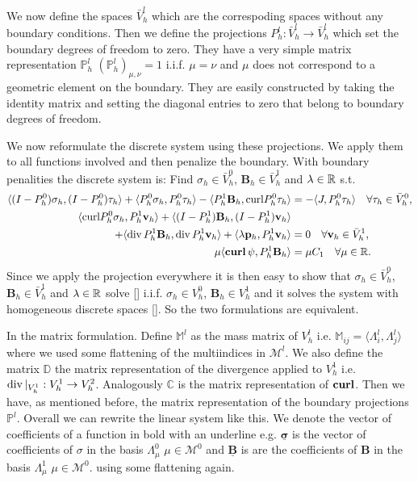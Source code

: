 \documentclass[../master_thesis.tex]{subfiles}
\begin{document}
We now define the spaces $\bar{V}_h^l$ which are the correspoding spaces 
without any boundary conditions. Then we define the 
projections $P_h^l: \bar{V}_h^l \rightarrow \bar{V}_h^l$ which set 
the boundary degrees of freedom to zero. They have a very simple 
matrix representation $\mathbb{P}_h^l$ 
$(\mathbb{P}_h^l)_{\mu, \nu} = 1 $ i.i.f. $\mu = \nu$ and $\mu$ does not 
correspond to a geometric element on the boundary. They are easily constructed 
by taking the identity matrix and setting the diagonal entries to zero that 
belong to boundary degrees of freedom.

We now reformulate the discrete system using these projections. We apply them 
to all functions involved and then penalize the boundary.
With boundary penalities the discrete system is: Find $\sigma_h \in \bar{V}_h^0$, 
$\mathbf{B}_h \in \bar{V}^1_h$ and $\lambda \in \real$ s.t.
\begin{align*}
    \langle (I-P^0_h)\sigma_h, (I-P^0_h)\tau_h \rangle + \langle P^0_h \sigma_h, P^0_h\tau_h \rangle 
        - \langle P^1_h \mathbf{B}_h, \mathbf{\curl}P^0_h\tau_h \rangle 
    &=  -\langle J, P^0_h \tau_h \rangle \quad \forall \tau_h \in \bar{V}_h^0, 
    \\ \langle \mathbf{\curl}P^0_h \sigma_h, P^1_h\mathbf{v}_h \rangle 
        + \langle (I-P^1_h)\mathbf{B}_h, (I-P^1_h)\mathbf{v}_h \rangle
    \\ \quad    + \langle \diver P^1_h\mathbf{B}_h, \diver P^1_h\mathbf{v}_h \rangle 
        + \langle \lambda \mathbf{p}_h, P^1_h\mathbf{v}_h \rangle 
    &= 0 \quad \forall \mathbf{v}_h \in \bar{V}^1_h, 
    \\ \mu \langle \bm{\curl} \psi, P^1_h \mathbf{B}_h \rangle &= \mu C_1 \quad \forall \mu \in \real.
\end{align*}
Since we apply the projection everywhere it is then easy to show that 
$\sigma_h \in \bar{V}_h^0$, 
$\mathbf{B}_h \in \bar{V}^1_h$ and $\lambda \in \real$ solve \ref{} 
i.i.f. $\sigma_h \in V_h^0$, $\mathbf{B}_h \in V^1_h$ 
and it solves the system with homogeneous discrete spaces \ref{}. 
So the two formulations are equivalent.

In the matrix formulation. Define $\mathbb{M}^l$ as the mass matrix 
of $V_h^l$ i.e. $\mathbb{M}_{ij} = \langle \Lambda^l_i , \Lambda^l_j \rangle$ 
where we used some flattening of the multiindices in $\mathcal{M}^l$. 
We also define the matrix $\mathbb{D}$ the matrix representation of the 
divergence applied to $V^1_h$ i.e. $\diver|_{V^1_h}: V^1_h \rightarrow V^2_h$.
Analogously $\mathbb{C}$ is the matrix representation of $\veccurl$. Then 
we have, as mentioned before, the matrix representation of the boundary projections 
$\mathbb{P}^l$. Overall we can rewrite the linear system like this. 
We denote the vector of coefficients of a function in bold with an underline e.g. 
$\underline{\bm{\sigma} }$ is the vector of coefficients of $\sigma$ in 
the basis $\Lambda^0_\mu$ $\mu \in \mathcal{M}^0$ 
and $\underline{\mathbf{B}}$ is are the coefficients of $\mathbf{B}$ in the basis 
$\Lambda^1_\mu$ $\mu \in \mathcal{M}^0$.
using some flattening again.
\end{document}
